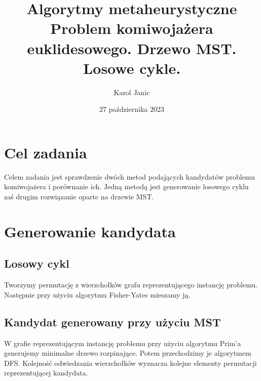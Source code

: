 \documentclass{article}
\begin{document}
\begin{titlingpage}
    \title{Algorytmy metaheurystyczne\\[1ex] \large Problem komiwojażera euklidesowego. Drzewo MST. Losowe cykle.}
    \author{Karol Janic}
    \date{27 października 2023}

    \maketitle
\end{titlingpage}

\tableofcontents

\newpage

\section{Cel zadania}
Celem zadania jest sprawdzenie dwóch metod podających kandydatów problemu komiwojażera i porównanie ich. Jedną metodą jest generowanie losowego cyklu zaś drugim rozwiązanie oparte na drzewie MST.

\section{Generowanie kandydata}
\subsection{Losowy cykl}
Tworzymy permutację z wierzchołków grafu reprezentującego instancję problemu. Następnie przy użyciu algorytmu Fisher-Yates mieszamy ją. 

\subsection{Kandydat generowany przy użyciu MST}
W grafie reprezentującym instancję problemu przy użyciu algorytmu Prim'a generujemy minimalne drzewo rozpinające. Potem przechodzimy je algorytmem DFS. Kolejność odwiedzania wierzchołków wyznacza kolejne elementy permutacji reprezentującej kandydata.
\end{document}
